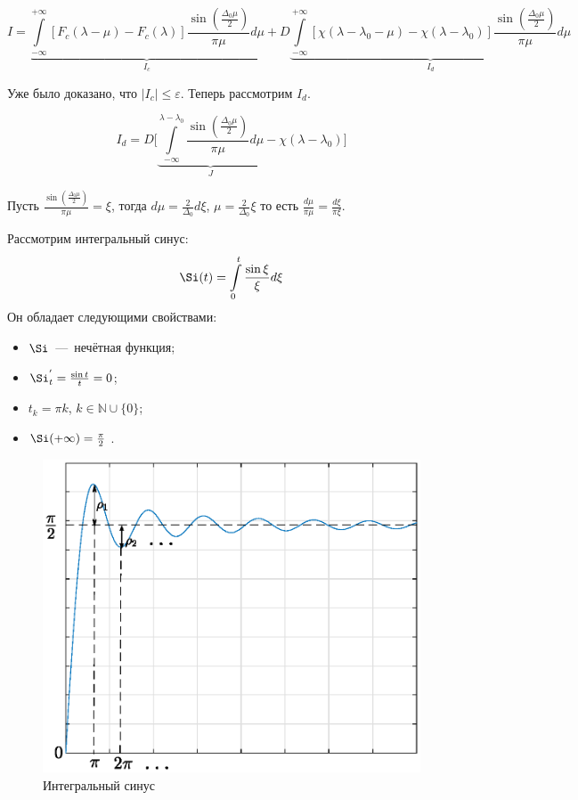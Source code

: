\begin{equation*}
I = \underbrace{\int \limits_{-\infty}^{+\infty}[F_c (\lambda - \mu) - F_c(\lambda)] \frac{\sin \left(\frac{\Delta_0 \mu}{2} \right)}{\pi \mu} d \mu}_{I_c} + D \underbrace{\int \limits_{-\infty}^{+\infty}[\chi (\lambda - \lambda_0 -  \mu) - \chi(\lambda - \lambda_0)] \frac{\sin \left(\frac{\Delta_0 \mu}{2} \right)}{\pi \mu} d \mu}_{I_d}
\end{equation*}

Уже было доказано, что $|I_c| \leq \varepsilon$. Теперь рассмотрим $I_d$.

\begin{equation*}
I_d = D \Bigg[ \underbrace{\int\limits_{-\infty}^{\lambda - \lambda_0} \frac{\sin \left(\frac{\Delta_0 \mu}{2} \right)}{\pi \mu} d \mu}_J - \chi (\lambda - \lambda_0) \Bigg]
\end{equation*}

Пусть $\frac{\sin \left(\frac{\Delta_0 \mu}{2} \right)}{\pi \mu} = \xi$, тогда $d \mu = \frac{2}{\Delta_0} d \xi$, $\mu = \frac{2}{\Delta_0} \xi$ то есть $\frac{d \mu}{\pi \mu} = \frac{d \xi}{\pi \xi}$.

Рассмотрим интегральный синус:
\begin{equation*}
\Si (t) = \int \limits_0^t \frac{\sin \xi}{\xi} d \xi
\end{equation*}
Он обладает следующими свойствами:
\begin{itemize}
\item $\Si$~---~нечётная функция;
\item $\Si_{t}^{'} = \frac{\sin t}{t} = 0$;
\item $t_k = \pi k$, $k \in \mathbb{N} \cup \{0\}$;
\item $\Si(+\infty) = \frac{\pi}{2}$	.
\end{itemize}

\begin{figure}[H]
\begin{center}
\includegraphics[width=0.6\linewidth]{ch8/ch8_fig4.eps}
\caption{Интегральный синус}
\label{ch1.fig2}
\end{center}
\end{figure}

